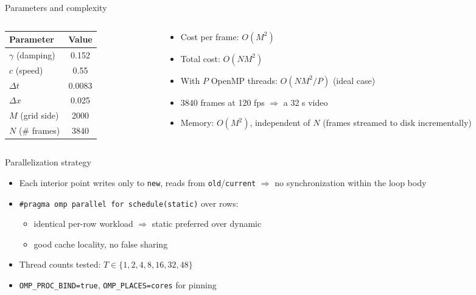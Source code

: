 \documentclass[11pt,aspectratio=169]{beamer}
\begin{document}
\begin{frame}{Parameters and complexity}
  \begin{columns}
    \begin{column}{0.5\textwidth}
      \begin{table}
        \centering\small
        \begin{tabular}{lc}
          \toprule
          Parameter & Value \\
          \midrule
          $\gamma$ (damping) & 0.152 \\
          $c$ (speed) & 0.55 \\
          $\Delta t$ & 0.0083 \\
          $\Delta x$ & 0.025 \\
          $M$ (grid side) & 2000 \\
          $N$ (\# frames) & 3840 \\
          \bottomrule
        \end{tabular}
      \end{table}
    \end{column}
    \begin{column}{0.5\textwidth}
      \begin{itemize}
        \item Cost per frame: $O(M^2)$
        \item Total cost: $O(N M^2)$
        \item With $P$ OpenMP threads: $O(NM^2/P)$ (ideal case)
        \item 3840 frames at 120 fps $\Rightarrow$ a 32 s video
        \item Memory: $O(M^2)$, independent of $N$ (frames streamed
          to disk incrementally)
      \end{itemize}
    \end{column}
  \end{columns}
\end{frame}

\begin{frame}{Parallelization strategy}
  \begin{itemize}
    \item Each interior point writes only to \texttt{new}, reads from
      \texttt{old}/\texttt{current} $\Rightarrow$ no synchronization
      within the loop body
    \item \texttt{\#pragma omp parallel for schedule(static)} over rows:
      \begin{itemize}
        \item identical per-row workload $\Rightarrow$ static
          preferred over dynamic
        \item good cache locality, no false sharing
      \end{itemize}
    \item Thread counts tested: $T \in \{1,2,4,8,16,32,48\}$
    \item \texttt{OMP\_PROC\_BIND=true}, \texttt{OMP\_PLACES=cores} for pinning
  \end{itemize}
\end{frame}
\end{document}
